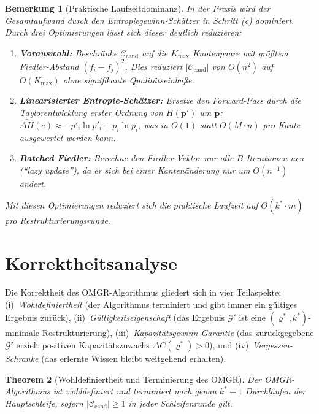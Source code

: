 \documentclass[12pt, a4paper, openany]{report}
\newtheorem{theorem}{Theorem}[chapter]
\newtheorem{remark}[theorem]{Bemerkung}
\newcommand{\calG}{\mathcal{G}}
\newcommand{\calC}{\mathcal{C}}
\begin{document}
\begin{remark}[Praktische Laufzeitdominanz]
\label{rem:runtime_practical}
In der Praxis wird der Gesamtaufwand durch den Entropiegewinn-Schätzer in
Schritt (c) dominiert.  Durch drei Optimierungen lässt sich dieser
deutlich reduzieren:
\begin{enumerate}[label=(\roman*)]
  \item \textbf{Vorauswahl:} Beschränke $\calC_{\mathrm{cand}}$ auf die
    $K_{\max}$ Knotenpaare mit größtem Fiedler-Abstand $(f_i - f_j)^2$.
    Dies reduziert $|\calC_{\mathrm{cand}}|$ von $O(n^2)$ auf $O(K_{\max})$
    ohne signifikante Qualitätseinbuße.
  \item \textbf{Linearisierter Entropie-Schätzer:} Ersetze den Forward-Pass
    durch die Taylorentwicklung erster Ordnung von $H(\bm{p}')$ um $\bm{p}$:
    $\widehat{\Delta H}(e) \approx -p'_i \ln p'_i + p_i \ln p_i$,
    was in $O(1)$ statt $O(M \cdot n)$ pro Kante ausgewertet werden kann.
  \item \textbf{Batched Fiedler:} Berechne den Fiedler-Vektor nur alle
    $B$ Iterationen neu (``lazy update''), da er sich bei einer
    Kantenänderung nur um $O(n^{-1})$ ändert.
\end{enumerate}
Mit diesen Optimierungen reduziert sich die praktische Laufzeit auf
$O(k^* \cdot m)$ pro Restrukturierungsrunde.
\end{remark}

\section{Korrektheitsanalyse}
\label{sec:algo_correctness}

Die Korrektheit des OMGR-Algorithmus gliedert sich in vier Teilaspekte:
(i)~\emph{Wohldefiniertheit} (der Algorithmus terminiert und gibt immer
ein gültiges Ergebnis zurück), (ii)~\emph{Gültigkeitseigenschaft}
(das Ergebnis $\calG'$ ist eine $(\varrho^*, k^*)$-minimale Restrukturierung),
(iii)~\emph{Kapazitätsgewinn-Garantie} (das zurückgegebene $\calG'$
erzielt positiven Kapazitätszuwachs $\Delta C(\varrho^*) > 0$), und
(iv)~\emph{Vergessen-Schranke} (das erlernte Wissen bleibt weitgehend
erhalten).

\begin{theorem}[Wohldefiniertheit und Terminierung des OMGR]
\label{thm:omgr_welldefined}
Der OMGR-Algorithmus ist wohldefiniert und terminiert nach
genau $k^* + 1$ Durchläufen der Hauptschleife, sofern
$|\calC_{\mathrm{cand}}| \geq 1$ in jeder Schleifenrunde gilt.
\end{theorem}
\end{document}
